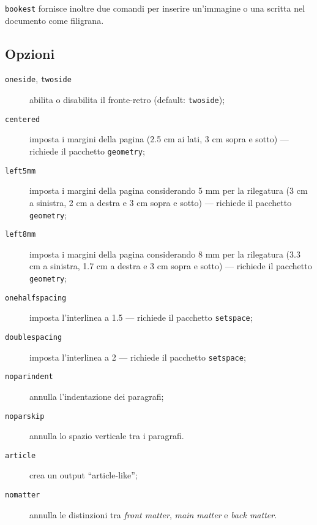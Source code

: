 \documentclass[a4paper,oneside,centered,noparindent,noparskip]{bookest}
\begin{document}
\texttt{bookest} fornisce inoltre due comandi per inserire un'immagine o una scritta nel documento come filigrana.

\subsection{Opzioni}
\begin{description}
 \item[\texttt{oneside}, \texttt{twoside}] abilita o disabilita il fronte-retro (default: \texttt{twoside});
\end{description}
\ppar
\begin{description}
 \item[\texttt{centered}] imposta i margini della pagina (2.5 cm ai lati, 3 cm sopra e sotto) --- richiede il pacchetto \texttt{geometry};
 \item[\texttt{left5mm}] imposta i margini della pagina considerando 5 mm per la rilegatura (3 cm a sinistra, 2 cm a destra e 3 cm sopra e sotto) --- richiede il pacchetto \texttt{geometry};
 \item[\texttt{left8mm}] imposta i margini della pagina considerando 8 mm per la rilegatura (3.3 cm a sinistra, 1.7 cm a destra e 3 cm sopra e sotto) --- richiede il pacchetto \texttt{geometry};
\end{description}
\ppar
\begin{description}
 \item[\texttt{onehalfspacing}] imposta l'interlinea a 1.5 --- richiede il pacchetto \texttt{setspace};
 \item[\texttt{doublespacing}] imposta l'interlinea a 2 --- richiede il pacchetto \texttt{setspace};
\end{description}
\ppar
\begin{description}
 \item[\texttt{noparindent}] annulla l'indentazione dei paragrafi;
 \item[\texttt{noparskip}] annulla lo spazio verticale tra i paragrafi.
\end{description}
\ppar
\begin{description}
 \item[\texttt{article}] crea un output ``article-like'';
 \item[\texttt{nomatter}] annulla le distinzioni tra \textit{front matter}, \textit{main matter} e \textit{back matter}.
\end{description}
\end{document}
